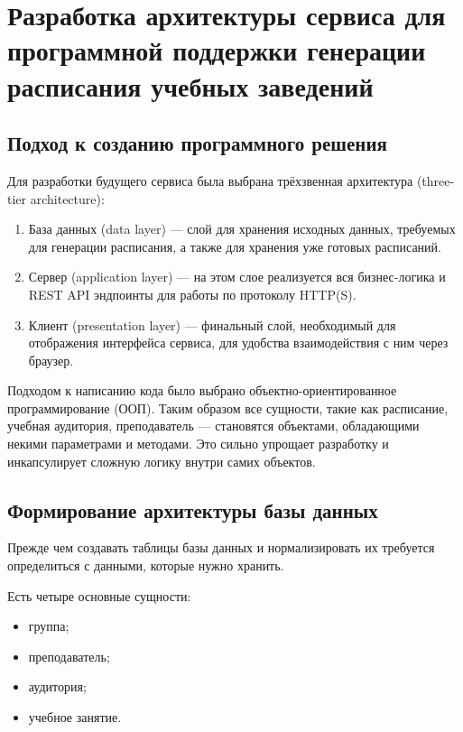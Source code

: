 \section{Разработка архитектуры сервиса для программной поддержки генерации расписания учебных заведений}

\subsection{Подход к созданию программного решения}

Для разработки будущего сервиса была выбрана трёхзвенная архитектура (three-tier architecture):

\begin{enumerate}
	\item База данных (data layer) --- слой для хранения исходных данных, требуемых для генерации расписания, а также для хранения уже готовых расписаний.
	\item Сервер (application layer) --- на этом слое реализуется вся бизнес-логика и REST API эндпоинты для работы по протоколу HTTP(S).
	\item Клиент (presentation layer) --- финальный слой, необходимый для отображения интерфейса сервиса, для удобства взаимодействия с ним через браузер.
\end{enumerate}

Подходом к написанию кода было выбрано объектно-ориентированное программирование (ООП). Таким образом все сущности, такие как расписание, учебная аудитория, преподаватель --- становятся объектами, обладающими некими параметрами и методами. Это сильно упрощает разработку и инкапсулирует сложную логику внутри самих объектов.

\subsection{Формирование архитектуры базы данных}

Прежде чем создавать таблицы базы данных и нормализировать их требуется определиться с данными, которые нужно хранить.

Есть четыре основные сущности:

\begin{itemize}
	\item группа;
	\item преподаватель;
	\item аудитория;
	\item учебное занятие.
\end{itemize}

